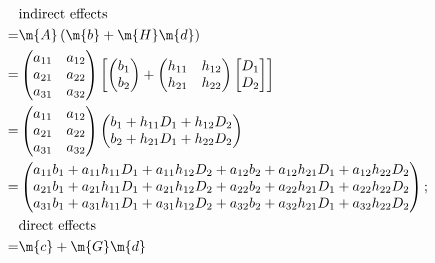 \begin{equation*}
    \begin{aligned}
        &\text{indirect effects}\\
        = &\m{A} \left( \m{b} + \m{H}\m{d} \right)\\
        = &\begin{pmatrix}
            a_{11}    &a_{12}\\
            a_{21}    &a_{22}\\
            a_{31}    &a_{32}
        \end{pmatrix}
        \left[\begin{pmatrix}
            b_1\\
            b_2
        \end{pmatrix} +
        \begin{pmatrix}
            h_{11}  &h_{12}\\
            h_{21}  &h_{22}
        \end{pmatrix}
        \begin{bmatrix}
            D_1\\
            D_2
        \end{bmatrix}
        \right]\\
        = &\begin{pmatrix}
            a_{11}    &a_{12}\\
            a_{21}    &a_{22}\\
            a_{31}    &a_{32}
        \end{pmatrix}
        \begin{pmatrix}
            b_1 + h_{11}D_1 + h_{12}D_2\\
            b_2 + h_{21}D_1 + h_{22}D_2
        \end{pmatrix}\\
        = &\begin{pmatrix}
            a_{11}b_1 + a_{11}h_{11}D_1 + a_{11}h_{12}D_2 +
            a_{12}b_2 + a_{12}h_{21}D_1 + a_{12}h_{22}D_2\\
            a_{21}b_1 + a_{21}h_{11}D_1 + a_{21}h_{12}D_2 +
            a_{22}b_2 + a_{22}h_{21}D_1 + a_{22}h_{22}D_2\\
            a_{31}b_1 + a_{31}h_{11}D_1 + a_{31}h_{12}D_2 +
            a_{32}b_2 + a_{32}h_{21}D_1 + a_{32}h_{22}D_2
        \end{pmatrix};\\
        &\text{direct effects}\\
        = &\m{c} + \m{G}\m{d}\\

\end{aligned}
\end{equation*}
